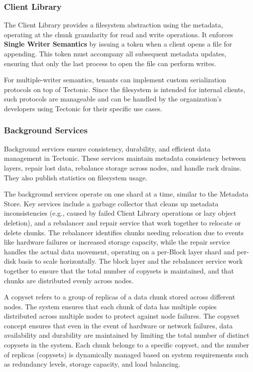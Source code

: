 \subsubsection{Client Library} \label{sec:client_library}

The Client Library provides a filesystem abstraction using the metadata, operating at the chunk granularity for read and write operations. It enforces \textbf{Single Writer Semantics} by issuing a token when a client opens a file for appending. This token must accompany all subsequent metadata updates, ensuring that only the last process to open the file can perform writes.

For multiple-writer semantics, tenants can implement custom serialization protocols on top of Tectonic. Since the filesystem is intended for internal clients, such protocols are manageable and can be handled by the organization's developers using Tectonic for their specific use cases.


\subsubsection{Background Services} \label{sec:background_services}

Background services ensure consistency, durability, and efficient data management in Tectonic. These services maintain metadata consistency between layers, repair lost data, rebalance storage across nodes, and handle rack drains. They also publish statistics on filesystem usage.

The background services operate on one shard at a time, similar to the Metadata Store. Key services include a garbage collector that cleans up metadata inconsistencies (e.g., caused by failed Client Library operations or lazy object deletion), and a rebalancer and repair service that work together to relocate or delete chunks. The rebalancer identifies chunks needing relocation due to events like hardware failures or increased storage capacity, while the repair service handles the actual data movement, operating on a per-Block layer shard and per-disk basis to scale horizontally. The block layer and the rebalancer service work together to ensure that the total number of copysets\cite{copyset} is maintained, and that chunks are distributed evenly across nodes. 

A copyset refers to a group of replicas of a data chunk stored across different nodes. The system ensures that each chunk of data has multiple copies distributed across multiple nodes to protect against node failures. The copyset concept ensures that even in the event of hardware or network failures, data availability and durability are maintained by limiting the total number of distinct copysets in the system. Each chunk belongs to a specific copyset, and the number of replicas (copysets) is dynamically managed based on system requirements such as redundancy levels, storage capacity, and load balancing.


